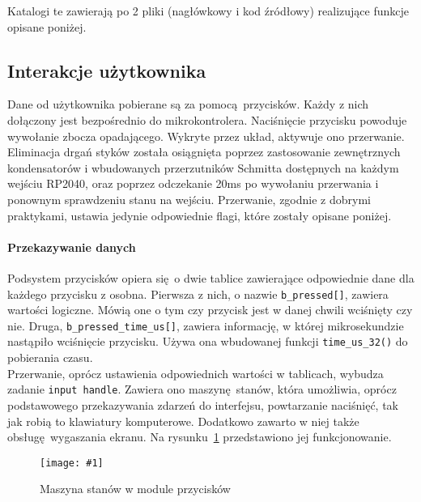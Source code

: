 \documentclass[polish]{aghengthesis}
\newcommand{\imgint}[4]{
	\begin{figure}[{#4}]
		\centering
		\texttt{[image: \#1]}
		\caption{#2}
		\label{#1}
	\end{figure}
}
\newcommand{\imgh}[3]{\imgint{#1}{#2}{#3}{H}}
\begin{document}
		Katalogi te zawierają po 2 pliki (nagłówkowy i kod źródłowy) realizujące funkcje opisane poniżej.
		
		\subsection{Interakcje użytkownika}
			Dane od użytkownika pobierane są za pomocą przycisków. Każdy z nich dołączony jest bezpośrednio do mikrokontrolera. Naciśnięcie przycisku powoduje wywołanie zbocza opadającego. Wykryte przez układ, aktywuje ono przerwanie. Eliminacja drgań styków została osiągnięta poprzez zastosowanie zewnętrznych kondensatorów i wbudowanych przerzutników Schmitta dostępnych na każdym wejściu RP2040, oraz poprzez odczekanie 20ms po wywołaniu przerwania i ponownym sprawdzeniu stanu na wejściu. Przerwanie, zgodnie z dobrymi praktykami, ustawia jedynie odpowiednie flagi, które zostały opisane poniżej.
			
			\paragraph{Przekazywanie danych}
				Podsystem przycisków opiera się o dwie tablice zawierające odpowiednie dane dla każdego przycisku z osobna. Pierwsza z nich, o nazwie \lstinline|b_pressed[]|, zawiera wartości logiczne. Mówią one o tym czy przycisk jest w danej chwili wciśnięty czy nie. Druga, \lstinline|b_pressed_time_us[]|, zawiera informację, w której mikrosekundzie nastąpiło wciśnięcie przycisku. Używa ona wbudowanej funkcji \lstinline|time_us_32()| do pobierania czasu.
			$ $\\
			
			Przerwanie, oprócz ustawienia odpowiednich wartości w tablicach, wybudza zadanie \lstinline|input handle|. Zawiera ono maszynę stanów, która umożliwia, oprócz podstawowego przekazywania zdarzeń do interfejsu, powtarzanie naciśnięć, tak jak robią to klawiatury komputerowe. Dodatkowo zawarto w niej także obsługę wygaszania ekranu. Na rysunku~\ref{3/PicoRadio-buttons} przedstawiono jej funkcjonowanie.
			
			\imgh{3/PicoRadio-buttons}{Maszyna stanów w module przycisków}{0.75}
			
\end{document}
